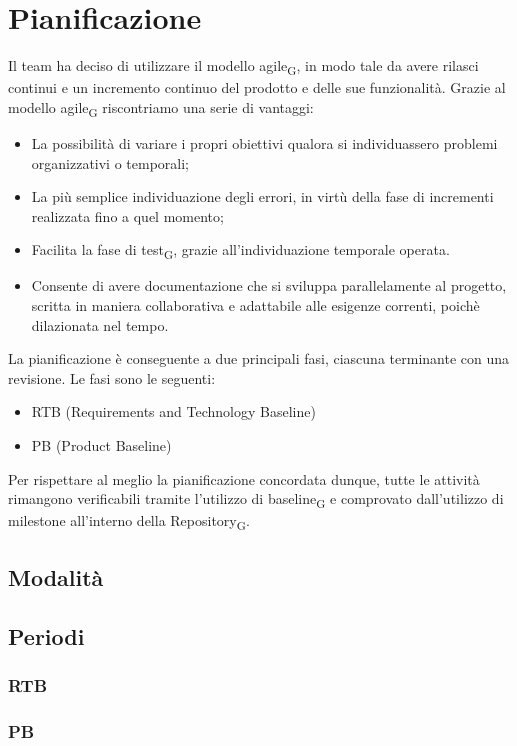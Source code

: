 \documentclass{article}
\begin{document}
\section{Pianificazione}
Il team ha deciso di utilizzare il modello agile\textsubscript{G}, in modo tale da avere rilasci continui e un incremento continuo del prodotto e delle sue funzionalità. Grazie al modello agile\textsubscript{G} riscontriamo una serie di vantaggi:
\begin{itemize}
    \item La possibilità di variare i propri obiettivi qualora si individuassero problemi organizzativi o temporali;
    \item La più semplice individuazione degli errori, in virtù della fase di incrementi realizzata fino a quel momento;
    \item Facilita la fase di test\textsubscript{G}, grazie all’individuazione temporale operata.
    \item Consente di avere documentazione che si sviluppa parallelamente al progetto, scritta in maniera collaborativa e adattabile alle esigenze correnti, poichè dilazionata nel tempo.
\end{itemize}

La pianificazione è conseguente a due principali fasi, ciascuna terminante con una revisione. Le fasi sono le seguenti:
\begin{itemize}
    \item RTB (Requirements and Technology Baseline)
    \item PB (Product Baseline)
\end{itemize}
Per rispettare al meglio la pianificazione concordata dunque, tutte le  attività rimangono verificabili tramite l’utilizzo di baseline\textsubscript{G} e comprovato dall’utilizzo di milestone all'interno della Repository\textsubscript{G}.
\subsection{Modalità}




\subsection{Periodi}
\subsubsection{RTB}
\subsubsection{PB}
\end{document}
